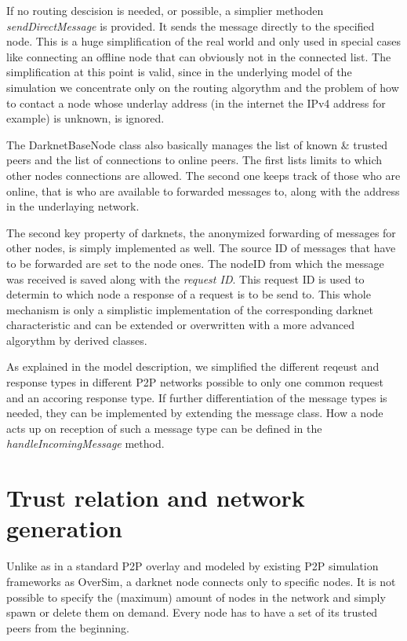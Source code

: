 If no routing descision is needed, or possible, a simplier methoden \emph{sendDirectMessage} is provided. It sends the message directly to the specified node. This is a huge simplification of the real world and only used in special cases like connecting an offline node that can obviously not in the connected list. The simplification at this point is valid, since in the underlying model of the simulation we concentrate only on the routing algorythm and the problem of how to contact a node whose underlay address (in the internet the IPv4 address for example) is unknown, is ignored.

The DarknetBaseNode class also basically manages the list of known & trusted peers and the list of connections to online peers. The first lists limits to which other nodes connections are allowed. The second one keeps track of those who are online, that is who are available to forwarded messages to, along with the address in the underlaying network.

The second key property of darknets, the anonymized forwarding of messages for other nodes, is simply implemented as well. The source ID of messages that have to be forwarded are set to the node ones. The nodeID from which the message was received is saved along with the \emph{request ID}. This request ID is used to determin to which node a response of a request is to be send to. This whole mechanism is only a simplistic implementation of the corresponding darknet characteristic and can be extended or overwritten with a more advanced algorythm by derived classes.

As explained in the model description, we simplified the different reqeust and response types in different P2P networks possible to only one common request and an accoring response type. If further differentiation of the message types is needed, they can be implemented by extending the message class. How a node acts up on reception of such a message type can be defined in the \emph{handleIncomingMessage} method.

\section{Trust relation and network generation}

Unlike as in a standard P2P overlay and modeled by existing P2P simulation frameworks as OverSim, a darknet node connects only to specific nodes. It is not possible to specify the (maximum) amount of nodes in the network and simply spawn or delete them on demand. Every node has to have a set of its trusted peers from the beginning.

